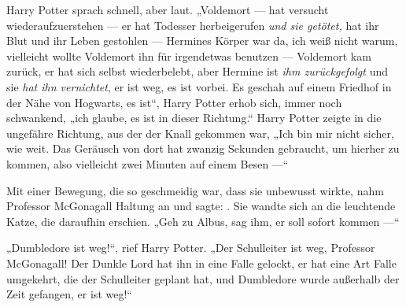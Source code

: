Harry Potter sprach schnell, aber laut.
„Voldemort — hat versucht wiederaufzuerstehen — er hat Todesser herbeigerufen \emph{und sie getötet,} hat ihr Blut und ihr Leben gestohlen — Hermines Körper war da, ich weiß nicht warum, vielleicht wollte Voldemort ihn für irgendetwas benutzen — Voldemort kam zurück, er hat sich selbst wiederbelebt, aber Hermine ist \emph{ihm zurückgefolgt} und sie \emph{hat ihn vernichtet}, er ist weg, es ist vorbei. Es geschah auf einem Friedhof in der Nähe von Hogwarts, es ist“, Harry Potter erhob sich, immer noch schwankend, „ich glaube, es ist in dieser Richtung.“
Harry Potter zeigte in die ungefähre Richtung, aus der der Knall gekommen war,
„Ich bin mir nicht sicher, wie weit. Das Geräusch von dort hat zwanzig Sekunden gebraucht, um hierher zu kommen, also vielleicht zwei Minuten auf einem Besen —“

Mit einer Bewegung, die so geschmeidig war, dass sie unbewusst wirkte, nahm Professor McGonagall Haltung an und sagte: . Sie wandte sich an die leuchtende Katze, die daraufhin erschien.
„Geh zu Albus, sag ihm, er soll sofort kommen —“

„Dumbledore ist weg!“, rief Harry Potter.
„Der Schulleiter ist weg, Professor McGonagall! Der Dunkle Lord hat ihn in eine Falle gelockt, er hat eine Art Falle umgekehrt, die der Schulleiter geplant hat, und Dumbledore wurde außerhalb der Zeit gefangen, er ist weg!“

